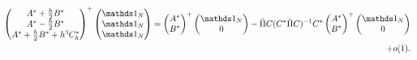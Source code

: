 \begin{lem}
\begin{align*}
    \begin{pmatrix}A^*+\frac{h}{2}B^* \\ A^*-\frac{h}{2}B^* \\ A^*+\frac{h}{2}B^*+h^3 C_h^*\end{pmatrix}^+
    \begin{pmatrix}\bun_N\\\bun_N\\\bun_N\end{pmatrix}
    = \begin{pmatrix}A^*\\ B^*\end{pmatrix}^{+}\begin{pmatrix}\bun_N\\0\end{pmatrix}-\tilde{\Pi}C(C^*\tilde{\Pi}C)^{-1}C^*\begin{pmatrix}A^*\\ B^*\end{pmatrix}^{+}\begin{pmatrix}\bun_N\\0\end{pmatrix}\\
    \qquad\qquad\qquad+o(1).
\end{align*}
\end{lem}

